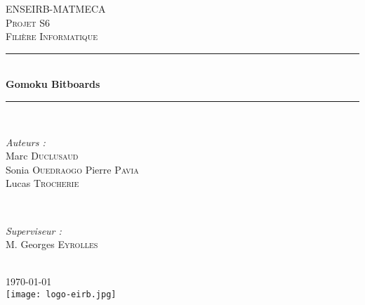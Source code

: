 \documentclass[12pt]{article}
\begin{document}
\begin{titlepage}

\newcommand{\HRule}{\rule{\linewidth}{0.5mm}} %

\center %


\textsc{\LARGE ENSEIRB-MATMECA}\\[1.5cm] %
\textsc{\Large Projet S6}\\[0.5cm] %
\textsc{\large Filière Informatique}\\[0.5cm] %


\HRule \\[0.4cm]
{\huge \bfseries Gomoku Bitboards}\\[0.4cm]
\HRule \\[1.5cm]


\begin{minipage}{0.4\textwidth}
\begin{flushleft} \large
\emph{Auteurs :}\\
Marc \textsc{Duclusaud} \\%
Sonia \textsc{Ouedraogo} %
Pierre \textsc{Pavia} \\%
Lucas \textsc{Trocherie} \\%
\end{flushleft}
\end{minipage}
~
\begin{minipage}{0.4\textwidth}
\begin{flushright} \large
\emph{Superviseur :} \\
M. Georges \textsc{Eyrolles}
\end{flushright}
\end{minipage}\\[1cm]

{\large \today}\\[2cm]

\texttt{[image: logo-eirb.jpg]}\\[1cm]

\vfill
\end{titlepage}
\end{document}
